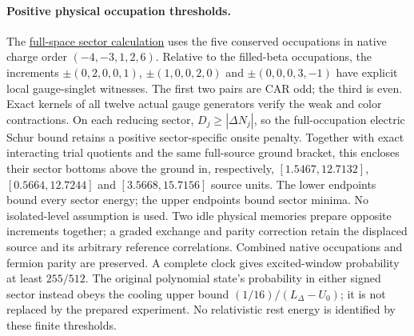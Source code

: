 \paragraph{Positive physical occupation thresholds.}
The \href{https://github.com/FloatingPragma/observer-patch-holography/blob/main/model/particle_primary_sector_threshold/PROOF.md}{full-space sector calculation}
uses the five conserved occupations in native charge order $(-4,-3,1,2,6)$.
Relative to the filled-beta occupations, the increments
$\pm(0,2,0,0,1)$, $\pm(1,0,0,2,0)$ and $\pm(0,0,0,3,-1)$
have explicit local gauge-singlet witnesses. The first two pairs are CAR odd;
the third is even. Exact kernels of all twelve actual gauge generators
verify the weak and color contractions. On each reducing sector,
$D_j\ge|\Delta N_j|$, so the full-occupation electric Schur bound
retains a positive sector-specific onsite penalty. Together with exact
interacting trial quotients and the same full-source ground bracket, this
encloses their sector bottoms above the ground in, respectively,
$[1.5467,12.7132]$, $[0.5664,12.7244]$ and $[3.5668,15.7156]$ source units.
The lower endpoints bound every sector energy; the upper endpoints bound
sector minima. No isolated-level assumption is used.
Two idle physical memories prepare opposite increments together; a graded
exchange and parity correction retain the displaced source and its arbitrary
reference correlations. Combined native occupations and fermion parity
are preserved. A complete clock gives excited-window probability at least
$255/512$. The original polynomial state's probability in either signed
sector instead obeys the cooling upper bound $(1/16)/(L_\Delta-U_0)$;
it is not replaced by the prepared experiment. No relativistic rest energy
is identified by these finite thresholds.

